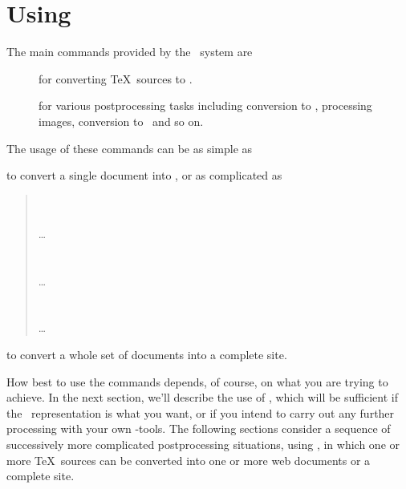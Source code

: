 \documentclass{book}
\begin{document}
\chapter{Using \LaTeXML}\label{usage}
The main commands provided by the \LaTeXML\ system are
\begin{description}
\item[] for converting \TeX\ sources to \XML.
\item[] for various postprocessing tasks including
conversion to \HTML, processing images, conversion to \MathML\ and so on.
\end{description}
The usage of these commands can be as simple as
\begin{quote}
\end{quote}
to convert a single document into \HTML,  or as complicated as
\begin{quote}
 \\
 \\
  \hbox{}\hspace{1in}\ldots\\
 \\
 \\
  \hbox{}\hspace{1in}\ldots\\
 \\
 \\
  \hbox{}\hspace{1in}\ldots
\end{quote}
to convert a whole set of documents into a complete site.

How best to use the commands depends, of course, on what you
are trying to achieve.  In the next section, we'll describe
the use of , which will be sufficient
if the \XML\ representation is what you want, or if you
intend to carry out any further processing with your own
\XML-tools.  The following sections consider a sequence of
successively more complicated postprocessing situations,
using ,
in which one or more \TeX\ sources can be converted into
one or more web documents or a complete site.

\end{document}
